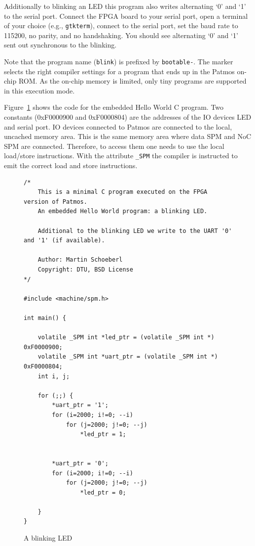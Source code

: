 \documentclass[a4paper,fontsize=10pt,twoside,DIV15,BCOR12mm,headinclude=true,footinclude=false,pagesize,bibtotoc]{scrbook}
\newcommand{\code}[1]{{\texttt{#1}}}
\begin{document}
Additionally to blinking an LED this program also writes alternating `0' and `1'
to the serial port. Connect the FPGA board to your serial port,
open a terminal of your choice (e.g., \code{gtkterm}), connect to the serial port,
set the baud rate to 115200, no parity, and no handshaking.
You should see alternating `0' and `1' sent out synchronous to the blinking.

Note that the program name (\code{blink}) is prefixed by \code{bootable-}.
The marker selects the right compiler settings for a program that ends up in
the Patmos on-chip ROM. As the on-chip memory is limited, only tiny programs
are supported in this execution mode.

Figure~\ref{fig:blink} shows the code for the embedded Hello World
C program. Two constants (0xF0000900 and 0xF0000804) are the addresses
of the IO devices LED and serial port. IO devices connected to Patmos are
connected to the local, uncached memory area. This is the same memory
area where data SPM and NoC SPM are connected. Therefore, to access them
one needs to use the local load/store instructions. With the attribute \code{\_SPM}
the compiler is instructed to emit the correct load and store instructions.

\begin{figure}
\begin{verbatim}
/*
    This is a minimal C program executed on the FPGA version of Patmos.
    An embedded Hello World program: a blinking LED.

    Additional to the blinking LED we write to the UART '0' and '1' (if available).

    Author: Martin Schoeberl
    Copyright: DTU, BSD License
*/

#include <machine/spm.h>

int main() {

    volatile _SPM int *led_ptr = (volatile _SPM int *) 0xF0000900;
    volatile _SPM int *uart_ptr = (volatile _SPM int *) 0xF0000804;
    int i, j;

    for (;;) {
        *uart_ptr = '1';
        for (i=2000; i!=0; --i)
            for (j=2000; j!=0; --j)
                *led_ptr = 1;


        *uart_ptr = '0';
        for (i=2000; i!=0; --i)
            for (j=2000; j!=0; --j)
                *led_ptr = 0;

    }
}\end{verbatim}
\caption{A blinking LED}
\label{fig:blink}
\end{figure}
\end{document}
